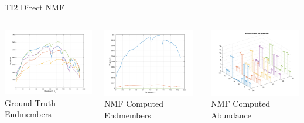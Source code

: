 \documentclass{beamer}
\begin{document}
\begin{frame}{TI2 Direct NMF}
\begin{columns}
    \begin{column}{0.33\textwidth}
        \includegraphics[width=4cm,center]{reflectance}
        \\ Ground Truth Endmembers
        \centering
    \end{column}
    \begin{column}{0.33\textwidth}
        \includegraphics[width=4cm,center]{other_ti2_nmf_endmembers.png}
        \\ NMF Computed Endmembers
        \centering
    \end{column}
    \begin{column}{0.33\textwidth}
        \includegraphics[width=4cm,center]{other_ti2_nmf_allmaterials.png}
        \\ NMF Computed Abundance
        \centering
    \end{column}
\end{columns}
\end{frame}
\end{document}
